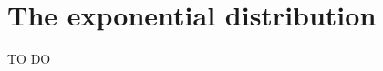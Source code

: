\documentclass[../../../main.tex]{subfiles}
\begin{document}
\chapter{The exponential distribution}

TO DO
\end{document}
